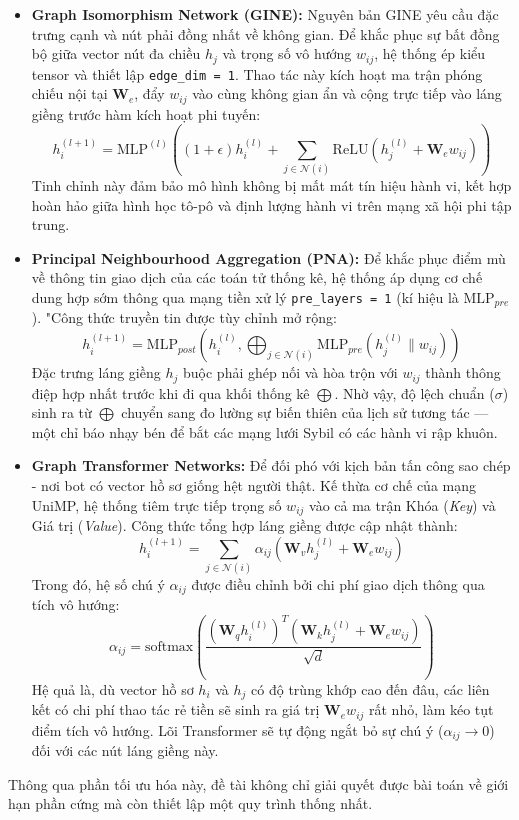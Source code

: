 \begin{itemize}[label={--}, itemsep=5pt]
\begin{itemize}[label={+}, itemsep=4pt]
            \item \textbf{Graph Isomorphism Network (GINE):} Nguyên bản GINE yêu cầu đặc trưng cạnh và nút phải đồng nhất về không gian. Để khắc phục sự bất đồng bộ giữa vector nút đa chiều $h_j$ và trọng số vô hướng $w_{ij}$, hệ thống ép kiểu tensor và thiết lập \texttt{edge\_dim = 1}. Thao tác này kích hoạt ma trận phóng chiếu nội tại $\mathbf{W}_e$, đẩy $w_{ij}$ vào cùng không gian ẩn và cộng trực tiếp vào láng giềng trước hàm kích hoạt phi tuyến:
            \[
                h_i^{(l+1)} = \text{MLP}^{(l)} \left( (1 + \epsilon) h_i^{(l)} + \sum_{j \in \mathcal{N}(i)} \text{ReLU} \left( h_j^{(l)} + \mathbf{W}_e w_{ij} \right) \right)
            \]
            Tinh chỉnh này đảm bảo mô hình không bị mất mát tín hiệu hành vi, kết hợp hoàn hảo giữa hình học tô-pô và định lượng hành vi trên mạng xã hội phi tập trung.

            \item \textbf{Principal Neighbourhood Aggregation (PNA):} Để khắc phục điểm mù về thông tin giao dịch của các toán tử thống kê, hệ thống áp dụng cơ chế dung hợp sớm thông qua mạng tiền xử lý \texttt{pre\_layers = 1} (kí hiệu là $\text{MLP}_{pre}$). "Công thức truyền tin được tùy chỉnh mở rộng:
            \[
                h_i^{(l+1)} = \text{MLP}_{post} \left( h_i^{(l)}, \bigoplus_{j \in \mathcal{N}(i)} \text{MLP}_{pre} \left( h_j^{(l)} \parallel w_{ij} \right) \right)
            \]
            Đặc trưng láng giềng $h_j$ buộc phải ghép nối và hòa trộn với $w_{ij}$ thành thông điệp hợp nhất trước khi đi qua khối thống kê $\bigoplus$. Nhờ vậy, độ lệch chuẩn ($\sigma$) sinh ra từ $\bigoplus$ chuyển sang đo lường sự biến thiên của lịch sử tương tác — một chỉ báo nhạy bén để bắt các mạng lưới Sybil có các hành vi rập khuôn.

            \item \textbf{Graph Transformer Networks:} Để đối phó với kịch bản tấn công sao chép - nơi bot có vector hồ sơ giống hệt người thật. Kế thừa cơ chế của mạng UniMP, hệ thống tiêm trực tiếp trọng số $w_{ij}$ vào cả ma trận Khóa (\textit{Key}) và Giá trị (\textit{Value}). Công thức tổng hợp láng giềng được cập nhật thành:
            \[
                h_i^{(l+1)} = \sum_{j \in \mathcal{N}(i)} \alpha_{ij} \left( \mathbf{W}_v h_j^{(l)} + \mathbf{W}_e w_{ij} \right)
            \]
            Trong đó, hệ số chú ý $\alpha_{ij}$ được điều chỉnh bởi chi phí giao dịch thông qua tích vô hướng:
            \[
                \alpha_{ij} = \text{softmax} \left( \frac{(\mathbf{W}_q h_i^{(l)})^T (\mathbf{W}_k h_j^{(l)} + \mathbf{W}_e w_{ij})}{\sqrt{d}} \right)
            \]
            Hệ quả là, dù vector hồ sơ $h_i$ và $h_j$ có độ trùng khớp cao đến đâu, các liên kết có chi phí thao tác rẻ tiền sẽ sinh ra giá trị $\mathbf{W}_e w_{ij}$ rất nhỏ, làm kéo tụt điểm tích vô hướng. Lõi Transformer sẽ tự động ngắt bỏ sự chú ý ($\alpha_{ij} \rightarrow 0$) đối với các nút láng giềng này.

            \end{itemize}
        \end{itemize}

Thông qua phần tối ưu hóa này, đề tài không chỉ giải quyết được bài toán về giới hạn phần cứng mà còn thiết lập một quy trình thống nhất.